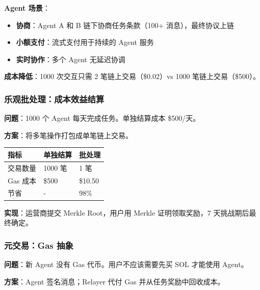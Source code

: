 \documentclass[11pt,a4paper]{article}
\begin{document}
\textbf{Agent 场景}：
\begin{itemize}[leftmargin=2em]
\item \textbf{协商}：Agent A 和 B 链下协商任务条款（100+ 消息），最终协议上链
\item \textbf{小额支付}：流式支付用于持续的 Agent 服务
\item \textbf{实时协作}：多个 Agent 无延迟协调
\end{itemize}

\textbf{成本降低}：1000 次交互只需 2 笔链上交易（\$0.02）vs 1000 笔链上交易（\$500）。

\subsubsection{乐观批处理：成本效益结算}

\textbf{问题}：1000 个 Agent 每天完成任务。单独结算成本 \$500/天。

\textbf{方案}：将多笔操作打包成单笔链上交易。

\begin{table}[H]\centering\small
\begin{tabular}{@{}lll@{}}
\toprule
\textbf{指标} & \textbf{单独结算} & \textbf{批处理} \\
\midrule
交易数量 & 1000 笔 & 1 笔 \\
Gas 成本 & \$500 & \$10.50 \\
节省 & - & 98\% \\
\bottomrule
\end{tabular}
\end{table}

\textbf{实现}：运营商提交 Merkle Root，用户用 Merkle 证明领取奖励，7 天挑战期后最终确定。

\subsubsection{元交易：Gas 抽象}

\textbf{问题}：新 Agent 没有 Gas 代币。用户不应该需要先买 SOL 才能使用 Agent。

\textbf{方案}：Agent 签名消息；Relayer 代付 Gas 并从任务奖励中回收成本。

\begin{center}
\end{center}
\end{document}
